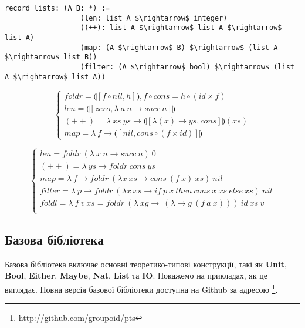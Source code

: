 \documentclass{article}
\begin{document}
\begin{lstlisting}[mathescape=true]
           record lists: (A B: *) :=
                  (len: list A $\rightarrow$ integer)
                  ((++): list A $\rightarrow$ list A $\rightarrow$ list A)
                  (map: (A $\rightarrow$ B) $\rightarrow$ (list A $\rightarrow$ list B))
                  (filter: (A $\rightarrow$ bool) $\rightarrow$ (list A $\rightarrow$ list A))
\end{lstlisting}

$$
\begin{cases}
foldr = \llparenthesis [ f \circ nil , h] \rrparenthesis, f \circ cons = h \circ (id \times f)\\
len = \llparenthesis [ zero, \lambda\ a\ n \rightarrow succ\ n ] \rrparenthesis \\
(++) = \lambda\ xs\ ys \rightarrow \llparenthesis [ \lambda (x) \rightarrow ys, cons ] \rrparenthesis (xs) \\
map = \lambda\ f \rightarrow \llparenthesis [ nil, cons \circ (f \times id)] \rrparenthesis
\end{cases}
$$

$$
\begin{cases}
len = foldr\ (\lambda\ x\ n \rightarrow succ\ n)\ 0\\
(++) = \lambda\ ys \rightarrow foldr\ cons\ ys\\
map = \lambda\ f \rightarrow foldr\ (\lambda x\ xs \rightarrow cons\ (f\ x)\ xs)\ nil\\
filter = \lambda\ p \rightarrow foldr\ (\lambda x\ xs \rightarrow if\ p\ x\ then\ cons\ x\ xs\ else\ xs)\ nil\\
foldl = \lambda\ f\ v\ xs = foldr\ (\lambda\ xg\rightarrow\ (\lambda \rightarrow g\ (f\ a\ x)))\ id\ xs\ v\\
\end{cases}
$$

\subsection{Базова бібліотека}
Базова бібліотека включає основні теоретико-типові конструкції, такі як
{\bf Unit}, {\bf Bool}, {\bf Either}, {\bf Maybe}, {\bf Nat}, {\bf List} та {\bf IO}.
Покажемо на прикладах, як це виглядає. Повна версія базової бібліотеки доступна на Github
за адресою \footnote{http://github.com/groupoid/pts}.
\end{document}
